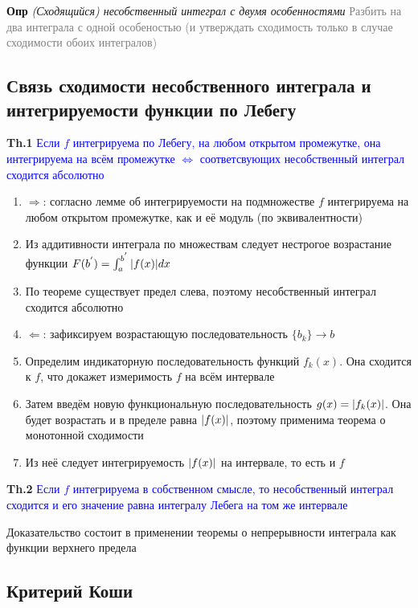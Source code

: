 \documentclass[a4paper, 14pt]{article}
\begin{document}
    \textbf{Опр} \textit{(Сходящийся) несобственный интеграл с двумя особенностями} \textcolor{gray}{Разбить на два
    интеграла с одной особеностью (и утверждать сходимость только в случае сходимости обоих интегралов)}

    \subsection{Связь сходимости несобственного интеграла и интегрируемости функции по Лебегу}

    \textbf{Th.1} \textcolor{blue}{Если $f$ интегрируема по Лебегу, на любом открытом промежутке, она
    интегрируема на всём промежутке $\Leftrightarrow$ соответсвующих несобственный интеграл сходится абсолютно}

    \begin{enumerate}
        \item $\Rightarrow$: согласно лемме об интегрируемости на подмножестве $f$ интегрируема на любом открытом
        промежутке, как и её модуль (по эквивалентности)
        \item Из аддитивности интеграла по множествам следует нестрогое возрастание функции $F(b^{'}) = \int_a^{b^{'}} \abs{f(x
            )} dx $
        \item По теореме существует предел слева, поэтому несобственный интеграл сходится абсолютно
        \item $\Leftarrow$: зафиксируем возрастающую последовательность $\{b_k\} \rightarrow b$
        \item Определим индикаторную последовательность функций $f_k(x)$.
        Она сходится к $f$, что докажет измеримость $f$ на всём интервале
        \item Затем введём новую функциональную последовательность $g(x) = \abs{f_k(x)}$.
        Она будет возрастать и в пределе равна $\abs{f(x)}$, поэтому применима теорема о монотонной сходимости
        \item Из неё следует интегрируемость $\abs{f(x)}$ на интервале, то есть и $f$
    \end{enumerate}

    \textbf{Th.2} \textcolor{blue}{Если $f$ интегрируема в собственном смысле, то несобственный интеграл сходится и
    его значение равна интегралу Лебега на том же интервале}

    Доказательство состоит в применении теоремы о непрерывности интеграла как функции верхнего предела

    \subsection{Критерий Коши}
\end{document}

